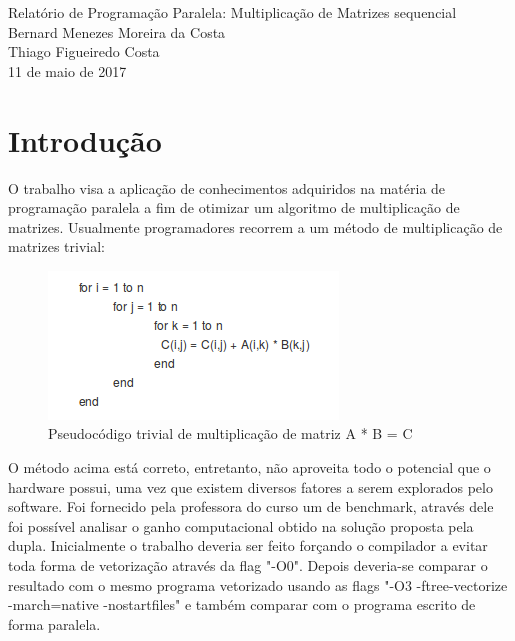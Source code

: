 \documentclass[a4paper, 10pt]{article}
\begin{document}
\begin{center}
{\huge Relatório de Programação Paralela: Multiplicação de Matrizes sequencial \\[7.5cm]}
{\Large Bernard Menezes Moreira da Costa\\Thiago Figueiredo Costa\\[10cm]11 de maio de 2017}
\end{center}
\newpage
\section{Introdução}
O trabalho visa a aplicação de conhecimentos adquiridos na matéria de programação paralela a fim de otimizar um algoritmo de multiplicação de matrizes. Usualmente programadores recorrem a um método de multiplicação de matrizes trivial:
\begin{figure}[!h]
\centering
\includegraphics[scale=0.6]{pseudocodigo}
\caption{Pseudocódigo trivial de multiplicação de matriz A * B = C}
\label{Pseudocódigo}
\end{figure}

O método acima está correto, entretanto, não aproveita todo o potencial que o hardware possui, uma vez que existem diversos fatores a serem explorados pelo software. Foi fornecido pela professora do curso um de benchmark, através dele foi possível analisar o ganho computacional obtido na solução proposta pela dupla. Inicialmente o trabalho deveria ser feito forçando o compilador a evitar toda forma de vetorização através da flag "-O0". Depois deveria-se comparar o resultado com o mesmo programa vetorizado usando as flags "-O3 -ftree-vectorize -march=native -nostartfiles"  e também comparar com o programa escrito de forma paralela.
\end{document}
